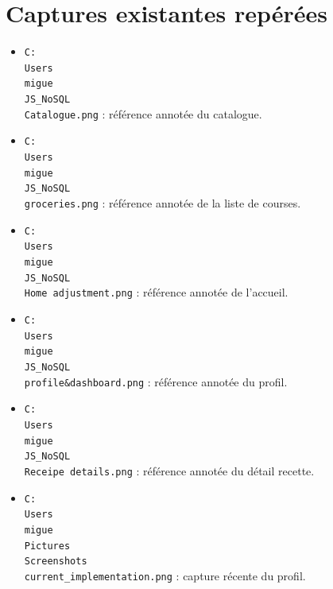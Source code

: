 \documentclass[12pt,a4paper]{article}
\begin{document}
\section*{Captures existantes repérées}
\begin{itemize}
\item \texttt{C:\\Users\\migue\\JS\_NoSQL\\Catalogue.png} : référence annotée du catalogue.
\item \texttt{C:\\Users\\migue\\JS\_NoSQL\\groceries.png} : référence annotée de la liste de courses.
\item \texttt{C:\\Users\\migue\\JS\_NoSQL\\Home adjustment.png} : référence annotée de l'accueil.
\item \texttt{C:\\Users\\migue\\JS\_NoSQL\\profile\&dashboard.png} : référence annotée du profil.
\item \texttt{C:\\Users\\migue\\JS\_NoSQL\\Receipe details.png} : référence annotée du détail recette.
\item \texttt{C:\\Users\\migue\\Pictures\\Screenshots\\current\_implementation.png} : capture récente du profil.
\end{itemize}
\end{document}
